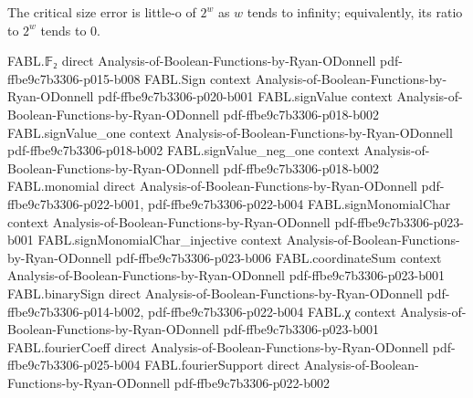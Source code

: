 \begin{theorem}
\label{FABL.tribesCriticalSizeError_isLittleO_two_pow}
\leanok
{}
The critical size error is little-o of $2^w$ as $w$ tends to infinity; equivalently, its
ratio to $2^w$ tends to $0$.
\end{theorem}

\begin{theorem}
\label{FABL.tribesCriticalDimension_isEquivalent_main}
\leanok
{}
\proofstep
  {FABL.𝔽₂}
  {direct}
  {Analysis-of-Boolean-Functions-by-Ryan-ODonnell}
  {pdf-ffbe9c7b3306-p015-b008}
\proofstep
  {FABL.Sign}
  {context}
  {Analysis-of-Boolean-Functions-by-Ryan-ODonnell}
  {pdf-ffbe9c7b3306-p020-b001}
\proofstep
  {FABL.signValue}
  {context}
  {Analysis-of-Boolean-Functions-by-Ryan-ODonnell}
  {pdf-ffbe9c7b3306-p018-b002}
\proofstep
  {FABL.signValue_one}
  {context}
  {Analysis-of-Boolean-Functions-by-Ryan-ODonnell}
  {pdf-ffbe9c7b3306-p018-b002}
\proofstep
  {FABL.signValue_neg_one}
  {context}
  {Analysis-of-Boolean-Functions-by-Ryan-ODonnell}
  {pdf-ffbe9c7b3306-p018-b002}
\proofstep
  {FABL.monomial}
  {direct}
  {Analysis-of-Boolean-Functions-by-Ryan-ODonnell}
  {pdf-ffbe9c7b3306-p022-b001,
    pdf-ffbe9c7b3306-p022-b004}
\proofstep
  {FABL.signMonomialChar}
  {context}
  {Analysis-of-Boolean-Functions-by-Ryan-ODonnell}
  {pdf-ffbe9c7b3306-p023-b001}
\proofstep
  {FABL.signMonomialChar_injective}
  {context}
  {Analysis-of-Boolean-Functions-by-Ryan-ODonnell}
  {pdf-ffbe9c7b3306-p023-b006}
\proofstep
  {FABL.coordinateSum}
  {context}
  {Analysis-of-Boolean-Functions-by-Ryan-ODonnell}
  {pdf-ffbe9c7b3306-p023-b001}
\proofstep
  {FABL.binarySign}
  {direct}
  {Analysis-of-Boolean-Functions-by-Ryan-ODonnell}
  {pdf-ffbe9c7b3306-p014-b002,
    pdf-ffbe9c7b3306-p022-b004}
\proofstep
  {FABL.χ}
  {context}
  {Analysis-of-Boolean-Functions-by-Ryan-ODonnell}
  {pdf-ffbe9c7b3306-p023-b001}
\proofstep
  {FABL.fourierCoeff}
  {direct}
  {Analysis-of-Boolean-Functions-by-Ryan-ODonnell}
  {pdf-ffbe9c7b3306-p025-b004}
\proofstep
  {FABL.fourierSupport}
  {direct}
  {Analysis-of-Boolean-Functions-by-Ryan-ODonnell}
  {pdf-ffbe9c7b3306-p022-b002}

\end{theorem}

